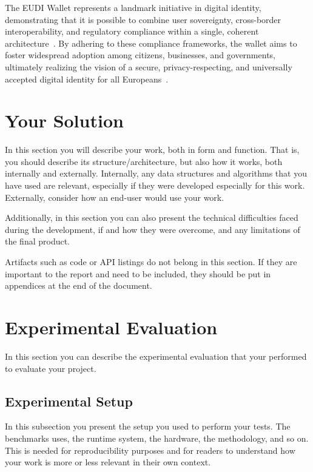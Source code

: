 \documentclass[sigconf,balance,nonacm,authordraft]{acmart}
\begin{document}
The EUDI Wallet represents a landmark initiative in digital identity, demonstrating that it is possible to combine user sovereignty, cross-border interoperability, and regulatory compliance within a single, coherent architecture~\cite{Gataca_ARF_SSI,ISC2_PrivacyDataSovereignty}. By adhering to these compliance frameworks, the wallet aims to foster widespread adoption among citizens, businesses, and governments, ultimately realizing the vision of a secure, privacy-respecting, and universally accepted digital identity for all Europeans~\cite{EU_ARF2024,EU_eIDAS2024}.
\section{Your Solution}
\label{sec:solution}
In this section you will describe your work, both in form and function. That is, you should describe its structure/architecture, but also how it works, both internally and externally. Internally, any data structures and algorithms that you have used are relevant, especially if they were developed especially for this work. Externally, consider how an end-user would use your work.

Additionally, in this section you can also present the technical difficulties faced during the development, if and how they were overcome, and any limitations of the final product.

Artifacts such as code or API listings do not belong in this section. If they are important to the report and need to be included, they should be put in appendices at the end of the document.

\section{Experimental Evaluation}
\label{sec:evaluation}
In this section you can describe the experimental evaluation that your performed to evaluate your project.

\subsection{Experimental Setup}
In this subsection you present the setup you used to perform your tests. The benchmarks uses, the runtime system, the hardware, the methodology, and so on. This is needed for reproducibility purposes and for readers to understand how your work is more or less relevant in their own context.
\end{document}
